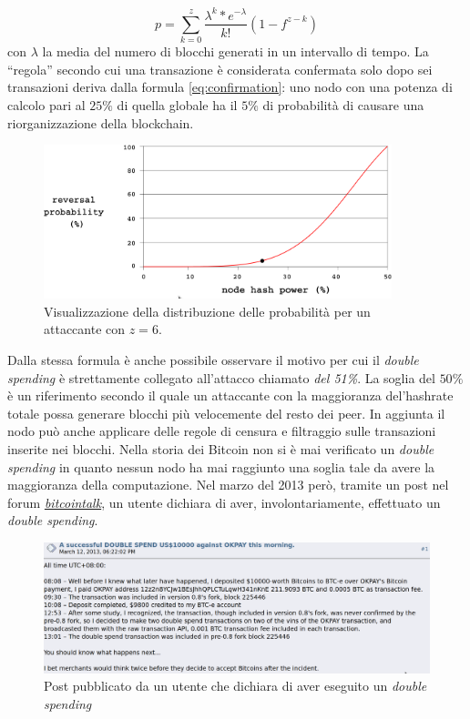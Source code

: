 \begin{equation}\label{eq:confirmation}
    p=\sum_{k=0}^{z} \frac{\lambda^{k}*e^{-\lambda}}{k!}(1-f^{z-k})
\end{equation}
con $\lambda$ la media del numero di blocchi generati in un intervallo di tempo. La ``regola'' secondo cui una transazione è considerata confermata solo dopo sei transazioni deriva dalla formula \ref{eq:confirmation}: uno nodo con una potenza di calcolo pari al $25\%$ di quella globale ha il $5\%$ di probabilità di causare una riorganizzazione della blockchain.
\begin{figure}[H]
    \centering
    \includegraphics[width=0.9\textwidth]{images/hashrate_curve.png}
    \caption{Visualizzazione della distribuzione delle probabilità per un attaccante con $z=6$.}
\end{figure}
Dalla stessa formula è anche possibile osservare il motivo per cui il \textit{double spending} è strettamente collegato all'attacco chiamato \textit{del 51\%}. La soglia del $50\%$ è un riferimento secondo il quale un attaccante con la maggioranza del'hashrate totale possa generare blocchi più velocemente del resto dei peer. In aggiunta il nodo può anche applicare delle regole di censura e filtraggio sulle transazioni inserite nei blocchi.\newline
Nella storia dei Bitcoin non si è mai verificato un \textit{double spending} in quanto nessun nodo ha mai raggiunto una soglia tale da avere la maggioranza della computazione. Nel marzo del 2013 però, tramite un post nel forum \href{https://bitcointalk.org/index.php?topic=152348.0}{\textit{bitcointalk}}, un utente dichiara di aver, involontariamente, effettuato un \textit{double spending}.
\begin{figure}[H]
    \centering
    \includegraphics[width=\textwidth]{images/double_spending_post.png}
    \caption{Post pubblicato da un utente che dichiara di aver eseguito un \textit{double spending}}
\end{figure}
